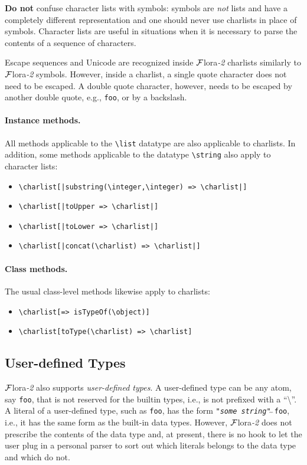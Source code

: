\documentclass[11pt]{article}
\newcommand{\FLORA}{{\mbox{\sc ${\cal F}${lora}\rm\emph{-2}}}\xspace}
\newcommand{\FLSYSTEM}{\FLORA}
\newcommand{\bs}{\textbackslash}
\newcommand{\dq}{\symbol{34}}
\begin{document}
\textbf{Do not} confuse character lists with symbols: symbols are
\emph{not} lists and have a completely different representation and one
should never use charlists in place of symbols. 
Character lists are
useful in situations when it is necessary to parse the contents of a
sequence of characters.

Escape sequences and Unicode are recognized inside \FLSYSTEM charlists
similarly to \FLSYSTEM symbols.  However, inside a charlist, a single quote
character does not need to be escaped. A double quote character, however,
needs to be escaped by another double quote, e.g.,
\texttt{{\dq}{\dq}{\dq}foo{\dq}{\dq}{\dq}}, or by a backslash.

\paragraph{Instance methods.}
All methods applicable to the \texttt{\bs{}list} datatype
are also applicable to charlists.
In addition, some methods applicable to the datatype \texttt{\bs{}string}
also apply to character lists:
\begin{itemize}
\item {\tt \bs{}charlist[|substring(\bs{}integer,\bs{}integer) => \bs{}charlist|]}  
\item {\tt \bs{}charlist[|toUpper => \bs{}charlist|]}  
\item {\tt \bs{}charlist[|toLower => \bs{}charlist|]}  
\item {\tt \bs{}charlist[|concat(\bs{}charlist) => \bs{}charlist|]}  
\end{itemize}

\paragraph{Class methods.}
The usual class-level methods likewise apply to charlists:
\begin{itemize}
\item {\tt \bs{}charlist[=> isTypeOf(\bs{}object)]}  
\item {\tt \bs{}charlist[toType(\bs{}charlist) => \bs{}charlist]}  
\end{itemize}




\subsection{User-defined Types}\label{sec-udt}

\FLSYSTEM also supports \emph{user-defined types}. A user-defined type can
be any atom, say \texttt{foo}, that is not reserved for the builtin types,
i.e., is not prefixed with a ``\bs''. A literal of a user-defined type,
such as \texttt{foo}, has the form 
\texttt{"\textnormal{\textit{some string}}"$\hat{~}\hat{~}$foo}, i.e., it
has the same form as the built-in data types. However, \FLSYSTEM does not
prescribe the contents of the data type and, at present, there is no hook
to let the user plug in a personal parser to sort out which literals
belongs to the data type and which do not.
\end{document}
